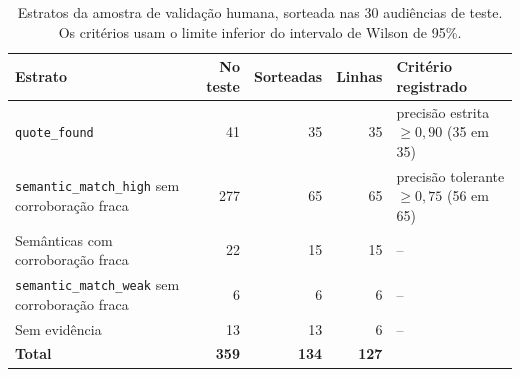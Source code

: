 \begin{table}[!htb]
  \centering
  \caption{Estratos da amostra de validação humana, sorteada nas 30 audiências de teste. Os critérios
  usam o limite inferior do intervalo de Wilson de 95\%.}
  \label{tab:amostra}
  \small
  \begin{tabularx}{\textwidth}{@{}Xrrrl@{}}
    \toprule
    \textbf{Estrato} & \textbf{No teste} & \textbf{Sorteadas} & \textbf{Linhas} & \textbf{Critério registrado} \\
    \midrule
    \texttt{quote\_found}                                   &  41 &  35 &  35 & precisão estrita $\geq 0{,}90$ (35 em 35) \\
    \texttt{semantic\_match\_high} sem corroboração fraca   & 277 &  65 &  65 & precisão tolerante $\geq 0{,}75$ (56 em 65) \\
    Semânticas com corroboração fraca                       &  22 &  15 &  15 & -- \\
    \texttt{semantic\_match\_weak} sem corroboração fraca   &   6 &   6 &   6 & -- \\
    Sem evidência                                           &  13 &  13 &   6 & -- \\
    \midrule
    \textbf{Total}                                          & \textbf{359} & \textbf{134} & \textbf{127} & \\
    \bottomrule
  \end{tabularx}
\end{table}
